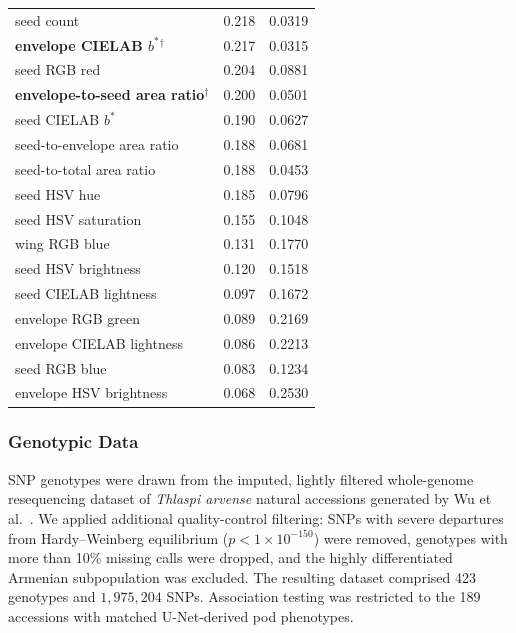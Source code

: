 \begin{table}[p]
\begin{tabularx}{\textwidth}{@{}>{\raggedright\arraybackslash}X c c@{}}
 seed count & 0.218 & 0.0319 \\
 \textbf{envelope CIELAB $b^*$}$^\dagger$ & 0.217 & 0.0315 \\
 seed RGB red & 0.204 & 0.0881 \\
 \textbf{envelope-to-seed area ratio}$^\dagger$ & 0.200 & 0.0501 \\
 seed CIELAB $b^*$ & 0.190 & 0.0627 \\
 seed-to-envelope area ratio & 0.188 & 0.0681 \\
 seed-to-total area ratio & 0.188 & 0.0453 \\
 seed HSV hue & 0.185 & 0.0796 \\
 seed HSV saturation & 0.155 & 0.1048 \\
 wing RGB blue & 0.131 & 0.1770 \\
 seed HSV brightness & 0.120 & 0.1518 \\
 seed CIELAB lightness & 0.097 & 0.1672 \\
 envelope RGB green & 0.089 & 0.2169 \\
 envelope CIELAB lightness & 0.086 & 0.2213 \\
 seed RGB blue & 0.083 & 0.1234 \\
 envelope HSV brightness & 0.068 & 0.2530 \\
 \bottomrule
 \end{tabularx}
\end{table}

\subsubsection{Genotypic Data}
SNP genotypes were drawn from the imputed, lightly filtered whole-genome resequencing dataset of \textit{Thlaspi arvense} natural accessions generated by Wu et al.\ \cite{wu2025thlaspi}. We applied additional quality-control filtering: SNPs with severe departures from Hardy--Weinberg equilibrium ($p < 1\times10^{-150}$) were removed, genotypes with more than 10\% missing calls were dropped, and the highly differentiated Armenian subpopulation was excluded. The resulting dataset comprised 423 genotypes and $1{,}975{,}204$ SNPs. Association testing was restricted to the 189 accessions with matched U-Net-derived pod phenotypes.

